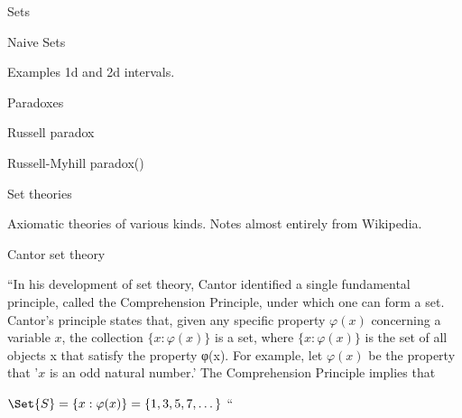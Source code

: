 \begin{plSection}{Sets}
\begin{plSection}{Naive Sets}
\begin{plSection}{Examples}
1d and 2d intervals.
 
% 
% 
% 
% 
% 
% 
\end{plSection}%
\end{plSection}%
\begin{plSection}{Paradoxes}
\label{sec:Paradoxes}

Russell paradox~\cite{iep:RussellParadox}

Russell-Myhill paradox(\cite{iep:RussellMyhillParadox})
\end{plSection}%
\begin{plSection}{Set theories}


Axiomatic theories of various kinds.
Notes almost entirely from 
Wikipedia\cite{wiki:Set_theory,iep:SetTheory,eom:SetTheory,sep:SetTheory}.

\begin{plSection}{Cantor set theory}
\label{sec:Cantor_set_theory}

``In his development of set theory, 
Cantor identified a single fundamental principle, 
called the Comprehension Principle, 
under which one can form a set.
Cantor’s principle states that, 
given any specific property $\varphi(x)$ 
concerning a variable $x$, 
the collection $\{x:\varphi(x)\}$ is a set, 
where $\{x:\varphi(x)\}$ is 
the set of all objects x that satisfy the property φ(x).
For example, let $\varphi(x)$ be the property that 
'$x$ is an odd natural number.' 
The Comprehension Principle implies that

$\Set{S}=\{x:\varphi(x)\}=\{1,3,5,7,\dots\}$ ``\cite{iep:SetTheory}


\end{plSection}
\end{plSection}
\end{plSection}
